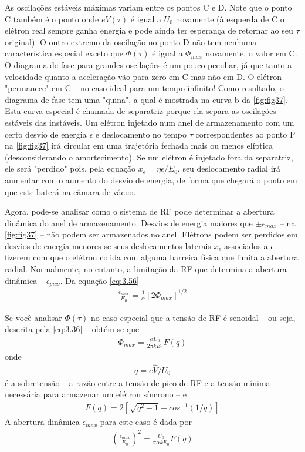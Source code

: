 As oscilações estáveis máximas variam entre os pontos C e D. Note que o ponto C também é o ponto onde $eV(\tau)$ é igual a $U_0$ novamente (à esquerda de C o elétron real sempre ganha energia e pode ainda ter esperança de retornar ao seu $\tau$ original). O outro extremo da oscilação no ponto D não tem nenhuma característica especial exceto que $\Phi(\tau)$ é igual a $\Phi_{max}$ novamente, o valor em C. O diagrama de fase para grandes oscilações é um pouco peculiar, já que tanto a velocidade quanto a aceleração vão para zero em C mas não em D. O elétron "permanece" em C -- no caso ideal para um tempo infinito! Como resultado, o diagrama de fase tem uma "quina", a qual é mostrada na curva b da \autoref{fig:fig37}. Esta curva especial é chamada de \uline{separatriz} porque ela separa as oscilações estáveis das instáveis. Um elétron injetado num anel de armazenamento com um certo desvio de energia $\epsilon$ e deslocamento no tempo $\tau$ correspondentes ao ponto P na \autoref{fig:fig37} irá circular em uma trajetória fechada mais ou menos elíptica (desconsiderando o amortecimento). Se um elétron é injetado fora da separatriz, ele será "perdido" pois, pela equação $x_\epsilon = \eta \epsilon/E_0$, seu deslocamento radial irá aumentar com o aumento do desvio de energia, de forma que chegará o ponto em que este baterá na câmara de vácuo.

Agora, pode-se analisar como o sistema de RF pode determinar a abertura dinâmica do anel de armazenamento. Desvios de energia maiores que $\pm \epsilon_{max}$ -- na \autoref{fig:fig37} -- não podem ser armazenados no anel. Elétrons podem ser perdidos em desvios de energia menores se seus deslocamentos laterais $x_\epsilon$ associados a $\epsilon$ fizerem com que o elétron colida com alguma barreira física que limita a abertura radial. Normalmente, no entanto, a limitação da RF que determina a abertura dinâmica $\pm \epsilon_{pico}$. Da equação \eqref{eq:3.56}
\begin{align}
	\frac{\epsilon_{max}}{E_0} = \frac{1}{\alpha}[2\Phi_{max}]^{1/2}
\end{align}

Se você analisar $\Phi(\tau)$ no caso especial que a tensão de RF é senoidal -- ou seja, descrita pela \eqref{eq:3.36} -- obtém-se que
\begin{align}
	\Phi_{max} = \frac{\alpha U_0}{2\pi k E_0} F(q)
\end{align}
onde
\begin{align}
	q = e\widehat{V}/U_0
\end{align}
é a sobretensão -- a razão entre a tensão de pico de RF e a tensão mínima necessária para armazenar um elétron síncrono -- e
\begin{align}
	F(q) = 2\left[\sqrt{q^2 - 1} - cos^{-1}(1/q)\right]
\end{align}
A abertura dinâmica $\epsilon_{max}$ para este caso é dada por
\begin{align}
	\left(\frac{\epsilon_{max}}{E_0}\right)^2 = \frac{U_0}{\pi \alpha k E_0} F(q)
\end{align}

